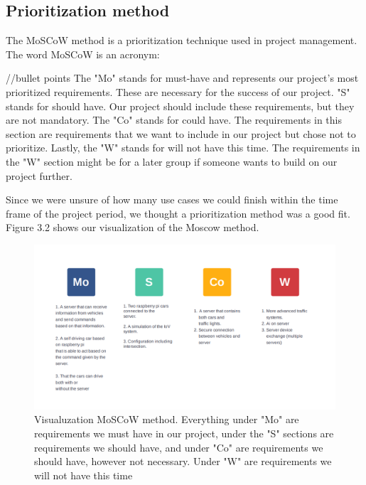 \subsection{Prioritization method}
The MoSCoW method is a prioritization technique used in project management. The word MoSCoW is an acronym:

//bullet points
The "Mo" stands for must-have and represents our project's most prioritized requirements. These are necessary for the success of our project. "S" stands for should have. Our project should include these requirements, but they are not mandatory. The "Co" stands for could have. The requirements in this section are requirements that we want to include in our project but chose not to prioritize. Lastly, the "W" stands for will not have this time. The requirements in the "W" section might be for a later group if someone wants to build on our project further.

Since we were unsure of how many use cases we could finish within the time frame of the project period, we thought a prioritization method was a good fit. Figure 3.2 shows our visualization of the Moscow method.

\begin{figure}[h!]
	\centering
	\includegraphics[width=1\linewidth]{figures/MosCoW_method}
	\caption[MosCoW method]{Visualuzation MoSCoW method. Everything under "Mo" are requirements we must have in our project, under the "S" sections are requirements we should have, and under "Co" are requirements we should have, however not necessary. Under "W" are requirements we will not have this time}
	\label{fig:moscowmethod}
\end{figure}


